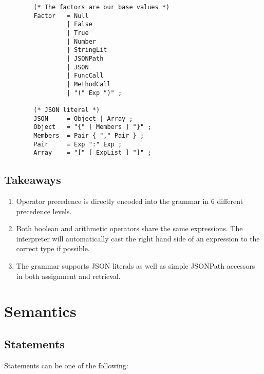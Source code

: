 \begin{center}
\begin{verbatim}
        (* The factors are our base values *)
        Factor   = Null
                 | False
                 | True
                 | Number
                 | StringLit
                 | JSONPath
                 | JSON
                 | FuncCall
                 | MethodCall
                 | "(" Exp ")" ;

        (* JSON literal *)
        JSON     = Object | Array ;
        Object   = "{" [ Members ] "}" ;
        Members  = Pair { "," Pair } ;
        Pair     = Exp ":" Exp ;
        Array    = "[" [ ExpList ] "]" ;
    \end{verbatim}
\end{center}

\subsection{Takeaways}

\begin{enumerate}
    \item Operator precedence is directly encoded into the grammar in 6 different precedence levels.
    \item Both boolean and arithmetic operators share the same expressions. The interpreter will automatically cast the right hand side of an expression to the correct type if possible.
    \item The grammar supports JSON literals as well as simple JSONPath accessors in both assignment and retrieval.
\end{enumerate}

\section{Semantics}

\subsection{Statements}

Statements can be one of the following:

